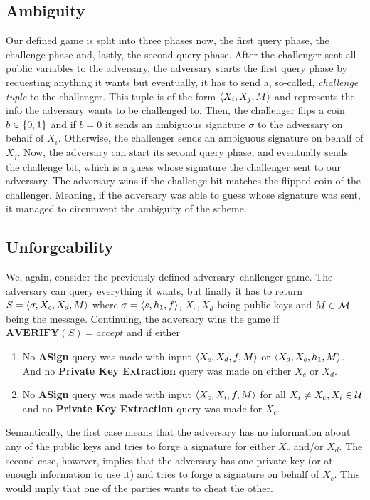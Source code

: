 \subsection{Ambiguity}
  Our defined game is split into three phases now, the first query phase, the challenge phase and, lastly, the second query phase. 
  After the challenger sent all public variables to the adversary, the adversary starts the first query phase by requesting anything it wants but eventually, it has to send a, so-called, \textit{challenge tuple} to the challenger.
  This tuple is of the form \(\langle X_i, X_j, M \rangle\) and represents the info the adversary wants to be challenged to.
  Then, the challenger flips a coin \(b\in \{ 0,1 \}\) and if \(b = 0\) it sends an ambiguous signature \(\sigma\) to the adversary on behalf of \(X_i\).
  Otherwise, the challenger sends an ambiguous signature on behalf of \(X_j\). Now, the adversary can start its second query phase, and eventually sends the challenge bit, which is a guess whose signature the challenger sent to our adversary.
  The adversary wins if the challenge bit matches the flipped coin of the challenger.
  Meaning, if the adversary was able to guess whose signature was sent, it managed to circumvent the ambiguity of the scheme.

\subsection{Unforgeability}\label{unforgeability}
  We, again, consider the previously defined adversary--challenger game.
  The adversary can query everything it wants, but finally it has to return \(S=\langle \sigma, X_c, X_d, M \rangle\) where \(\sigma=\langle s, h_1, f \rangle\), \(X_c, X_d\) being public keys and \(M\in\mathcal{M}\) being the message.
  Continuing, the adversary wins the game if \(\textbf{AVERIFY}(S) = accept\) and if either
    \begin{enumerate}
      \item No \textbf{ASign} query was made with input \(\langle X_c, X_d, f, M \rangle\) or \(\langle X_d, X_c, h_1, M \rangle\).
            And no \textbf{Private Key Extraction} query was made on either \(X_c\) or \(X_d\).
      \item No \textbf{ASign} query was made with input \(\langle X_c, X_i, f, M \rangle\) for all \(X_i \neq X_c, X_i\in\mathcal{U}\) and no \textbf{Private Key Extraction} query was made for \(X_c\).
    \end{enumerate}
  Semantically, the first case means that the adversary has no information about any of the public keys and tries to forge a signature for either \(X_c\) and/or \(X_d\).
  The second case, however, implies that the adversary has one private key (or at enough information to use it) and tries to forge a signature on behalf of \(X_c\).
  This would imply that one of the parties wants to cheat the other.

